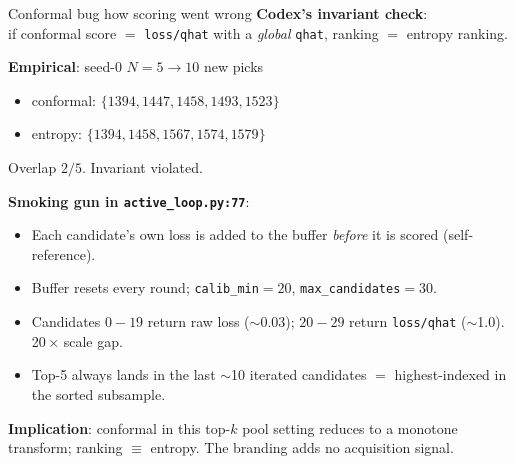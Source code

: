\documentclass[aspectratio=169]{beamer}
\newcommand{\bad}[1]{\textcolor{bad}{#1}}
\begin{document}
\begin{frame}{Conformal bug \textemdash{} how scoring went wrong}
\textbf{Codex's invariant check}:\\
if conformal score $=$ \texttt{loss/qhat} with a \emph{global} \texttt{qhat}, ranking $=$ entropy ranking.
\vspace{0.5em}

\textbf{Empirical}: seed-0 $N{=}5{\to}10$ new picks
\begin{itemize}
  \item conformal: $\{1394, 1447, 1458, 1493, 1523\}$
  \item entropy:\hspace{1.05em} $\{1394, 1458, 1567, 1574, 1579\}$
\end{itemize}
Overlap $2/5$. \bad{Invariant violated.}
\vspace{0.5em}

\textbf{Smoking gun in \texttt{active\_loop.py:77}}:
\begin{itemize}
  \item Each candidate's own loss is added to the buffer \emph{before} it is scored (self-reference).
  \item Buffer resets every round; \texttt{calib\_min}$=20$, \texttt{max\_candidates}$=30$.
  \item Candidates $0{-}19$ return raw loss ($\sim$0.03); $20{-}29$ return \texttt{loss/qhat} ($\sim$1.0). 20\,$\times$ scale gap.
  \item Top-5 always lands in the last $\sim$10 iterated candidates $=$ highest-indexed in the sorted subsample.
\end{itemize}
\textbf{Implication}: conformal in this top-$k$ pool setting reduces to a monotone transform; ranking $\equiv$ entropy. The branding adds no acquisition signal.
\end{frame}
\end{document}
